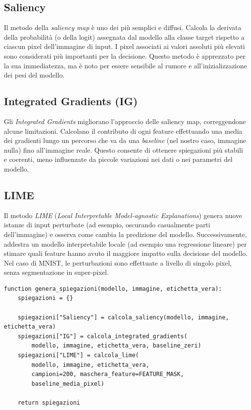 \documentclass{article}
\begin{document}
\subsection{Saliency}
Il metodo della \emph{saliency map} è uno dei più semplici e diffusi. Calcola
la derivata della probabilità (o della logit) assegnata dal modello alla classe
target rispetto a ciascun pixel dell’immagine di input. I pixel associati ai
valori assoluti più elevati sono considerati più importanti per la decisione.
Questo metodo è apprezzato per la sua immediatezza, ma è noto per essere
sensibile al rumore e all’inizializzazione dei pesi del modello.

\subsection{Integrated Gradients (IG)}
Gli \emph{Integrated Gradients} migliorano l’approccio delle saliency map,
correggendone alcune limitazioni. Calcolano il contributo di ogni feature
effettuando una media dei gradienti lungo un percorso che va da una
\emph{baseline} (nel nostro caso, immagine nulla) fino all’immagine reale.
Questo consente di ottenere spiegazioni più stabili e coerenti, meno
influenzate da piccole variazioni nei dati o nei parametri del modello.

\subsection{LIME}
Il metodo \emph{LIME} (\emph{Local Interpretable Model-agnostic Explanations})
genera nuove istanze di input perturbate (ad esempio, oscurando casualmente
parti dell’immagine) e osserva come cambia la predizione del modello.
Successivamente, addestra un modello interpretabile locale (ad esempio una
regressione lineare) per stimare quali feature hanno avuto il maggiore impatto
sulla decisione del modello. Nel caso di MNIST, le perturbazioni sono
effettuate a livello di singolo pixel, senza segmentazione in super-pixel.

\begin{lstlisting}[caption={Generazione delle spiegazioni}, label={lst:xai_generation}]
function genera_spiegazioni(modello, immagine, etichetta_vera):
    spiegazioni = {}
    
    spiegazioni["Saliency"] = calcola_saliency(modello, immagine, etichetta_vera)
    spiegazioni["IG"] = calcola_integrated_gradients(
        modello, immagine, etichetta_vera, baseline_zeri)
    spiegazioni["LIME"] = calcola_lime(
        modello, immagine, etichetta_vera,
        campioni=200, maschera_feature=FEATURE_MASK,
        baseline_media_pixel)
    
    return spiegazioni
\end{lstlisting}
\end{document}
